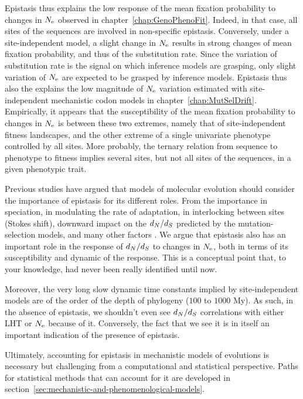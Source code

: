 Epistasis thus explains the low response of the mean fixation probability to changes in $N_{\textrm{e}}$ observed in chapter~\ref{chap:GenoPhenoFit}.
Indeed, in that case, all sites of the sequences are involved in non-specific epistasis.
Conversely, under a site-independent model, a slight change in $N_{\textrm{e}}$ results in strong changes of mean fixation probability, and thus of the substitution rate.
Since the variation of substitution rate is the signal on which inference models are grasping, only slight variation of $N_{\textrm{e}}$ are expected to be grasped by inference models.
Epistasis thus also the explains the low magnitude of $N_{\textrm{e}}$ variation estimated with site-independent mechanistic codon models in chapter~\ref{chap:MutSelDrift}.
Empirically, it appears that the susceptibility of the mean fixation probability to changes in $N_{\textrm{e}}$ is between these two extremes, namely that of site-independent fitness landscapes, and the other extreme of a single univariate phenotype controlled by all sites.
More probably, the ternary relation from sequence to phenotype to fitness implies several sites, but not all sites of the sequences, in a given phenotypic trait.

Previous studies have argued that models of molecular evolution should consider the importance of epistasis for its different roles.
From the importance in speciation, in modulating the rate of adaptation, in interlocking between sites (Stokes shift), downward impact on the $d_N / d_S$ predicted by the mutation-selection models, and many other factors \citet{Goldstein2017, Miller2018}.
We argue that epistasis also has an important role in the response of $d_N / d_S$ to changes in $N_{\textrm{e}}$, both in terms of its susceptibility and dynamic of the response.
This is a conceptual point that, to your knowledge, had never been really identified until now.

Moreover, the very long slow dynamic time constants implied by site-independent models are of the order of the depth of phylogeny ($100$ to $1000$ My).
As such, in the absence of epistasis, we shouldn't even see $d_N / d_S$ correlations with either LHT or $N_{\textrm{e}}$ because of it.
Conversely, the fact that we see it is in itself an important indication of the presence of epistasis.

Ultimately, accounting for epistasis in mechanistic models of evolutions is necessary but challenging from a computational and statistical perspective.
Paths for statistical methods that can account for it are developed in section~\ref{sec:mechanistic-and-phenomenological-models}.


